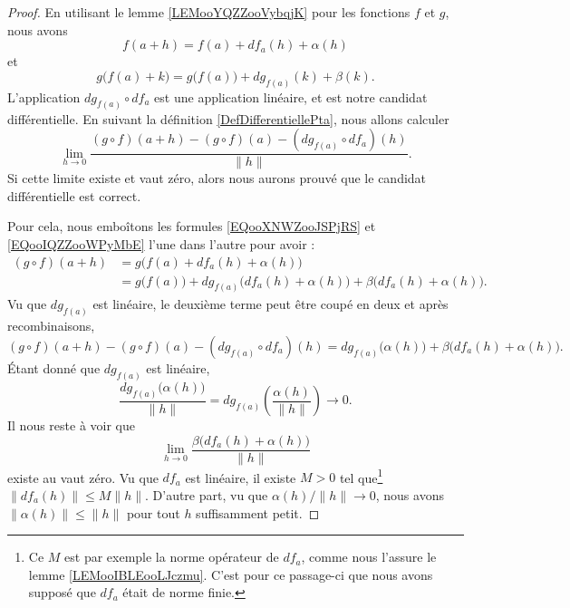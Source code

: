 \begin{proof}
	En utilisant le lemme \ref{LEMooYQZZooVybqjK} pour les fonctions \( f\) et \( g\), nous avons
	\begin{equation}        \label{EQooXNWZooJSPjRS}
		f(a+h)=f(a)+df_a(h)+\alpha(h)
	\end{equation}
	et
	\begin{equation}        \label{EQooIQZZooWPyMbE}
		g\big( f(a)+k \big)=g\big( f(a) \big)+dg_{f(a)}(k)+\beta(k).
	\end{equation}
	L'application \( dg_{f(a)}\circ df_a\) est une application linéaire, et est notre candidat différentielle. En suivant la définition \ref{DefDifferentiellePta}, nous allons calculer
	\begin{equation}
		\lim_{h\to 0} \frac{ (g\circ f)(a+h)-(g\circ f)(a)-(dg_{f(a)}\circ df_a)(h) }{ \| h \| }.
	\end{equation}
	Si cette limite existe et vaut zéro, alors nous aurons prouvé que le candidat différentielle est correct.

	Pour cela, nous emboîtons les formules \eqref{EQooXNWZooJSPjRS} et \eqref{EQooIQZZooWPyMbE} l'une dans l'autre pour avoir :
	\begin{subequations}
		\begin{align}
			(g\circ f)(a+h) & =g\big( f(a)+df_a(h)+\alpha(h) \big)                                                          \\
			                & =g\big( f(a) \big)+dg_{f(a)}\big( df_a(h)+\alpha(h) \big)+\beta\big( df_a(h)+\alpha(h) \big).
		\end{align}
	\end{subequations}
	Vu que \( dg_{f(a)}\) est linéaire, le deuxième terme peut être coupé en deux et après recombinaisons,
	\begin{equation}
		(g\circ f)(a+h)-(g\circ f)(a)-(dg_{f(a)}\circ df_a)(h)=dg_{f(a)}\big( \alpha(h) \big)+\beta\big( df_a(h)+\alpha(h) \big).
	\end{equation}
	Étant donné que \( dg_{f(a)}\) est linéaire,
	\begin{equation}
		\frac{ dg_{f(a)}\big(\alpha(h)\big) }{ \| h \| }=dg_{f(a)}\left( \frac{ \alpha(h) }{ \| h \| } \right)\to 0.
	\end{equation}
	Il nous reste à voir que
	\begin{equation}        \label{EQooUQNUooFgNyJp}
		\lim_{h\to 0} \frac{ \beta\big( df_a(h)+\alpha(h) \big) }{ \| h \| }
	\end{equation}
	existe au vaut zéro. Vu que \( df_a\) est linéaire, il existe \( M>0\) tel que\footnote{Ce \( M\) est par exemple la norme opérateur de \( df_a\), comme nous l'assure le lemme \ref{LEMooIBLEooLJczmu}. C'est pour ce passage-ci que nous avons supposé que \( df_a\) était de norme finie.} \( \| df_a(h) \|\leq M\| h \|\). D'autre part, vu que \( \alpha(h)/\| h \|\to 0\), nous avons \( \| \alpha(h) \|\leq \| h \|\) pour tout \( h\) suffisamment petit.


\end{proof}
